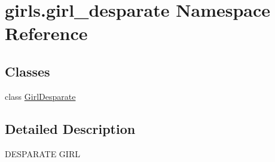 \hypertarget{namespacegirls_1_1girl__desparate}{}\section{girls.\+girl\+\_\+desparate Namespace Reference}
\label{namespacegirls_1_1girl__desparate}
\subsection*{Classes}
\begin{DoxyCompactItemize}
\item 
class \hyperlink{classgirls_1_1girl__desparate_1_1_girl_desparate}{Girl\+Desparate}
\end{DoxyCompactItemize}


\subsection{Detailed Description}
\begin{DoxyVerb}DESPARATE GIRL\end{DoxyVerb}
 